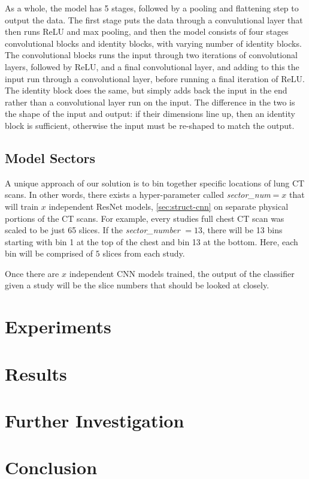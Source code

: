 \documentclass[10pt,twocolumn,letterpaper]{article}
\begin{document}
         As a whole, the model has 5 stages, followed by a pooling and flattening step to output the data. The first stage puts the data through a convulutional layer that then runs ReLU and max pooling, and then the model consists of four stages convolutional blocks and identity blocks, with varying number of identity blocks. The convolutional blocks runs the input through two iterations of convolutional layers, followed by ReLU, and a final convolutional layer, and adding to this the input run through a convolutional layer, before running a final iteration of ReLU. The identity block does the same, but simply adds back the input in the end rather than a convolutional layer run on the input. The difference in the two is the shape of the input and output: if their dimensions line up, then an identity block is sufficient, otherwise the input must be re-shaped to match the output.

   \subsection{Model Sectors} \label{sec:struct-sector}

        A unique approach of our solution is to bin together specific locations of lung CT scans. In other words, there exists
        a hyper-parameter called {\it sector\_num}$=x$ that will train $x$ independent ResNet models, \ref{sec:struct-cnn} on separate
        physical portions of the CT scans. For example, every studies full chest CT scan was scaled to be just 65 slices. If the {\it sector\_number} $=13$,
        there will be 13 bins starting with bin 1 at the top of the chest and bin 13 at the bottom. Here, each bin will be comprised
        of $5$ slices from each study.

        Once there are $x$ independent CNN models trained, the output of the classifier given a study will
        be the slice numbers that should be looked at closely.

\section{Experiments} \label{sec:experiments}

\section{Results} \label{sec:results}

\section{Further Investigation} \label{sec:further}

\section{Conclusion} \label{sec:conclusion}

{\small





}
\end{document}
